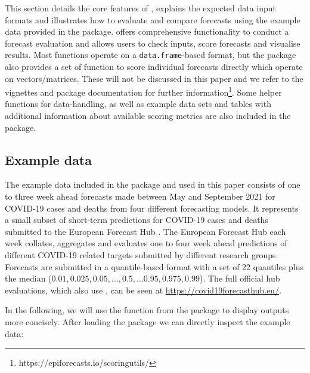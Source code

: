 \documentclass[
]{jss}
\begin{document}
This section details the core features of , explains
the expected data input formats and illustrates how to evaluate and
compare forecasts using the example data provided in the package.
 offers comprehensive functionality to conduct a
forecast evaluation and allows users to check inputs, score forecasts
and visualise results. Most functions operate on a
\texttt{data.frame}-based format, but the package also provides a set of
function to score individual forecasts directly which operate on
vectors/matrices. These will not be discussed in this paper and we refer
to the vignettes and package documentation for further
information\footnote{https://epiforecasts.io/scoringutils/}. Some helper
functions for data-handling, as well as example data sets and tables
with additional information about available scoring metrics are also
included in the package.

\hypertarget{example-data}{%
\subsection{Example data}\label{example-data}}

The example data included in the package and used in this paper consists
of one to three week ahead forecasts made between May and September 2021
for COVID-19 cases and deaths from four different forecasting models. It
represents a small subset of short-term predictions for COVID-19 cases
and deaths submitted to the European Forecast Hub
\citep{europeancovid-19forecasthubEuropeanCovid19Forecast2021}. The
European Forecast Hub each week collates, aggregates and evaluates one
to four week ahead predictions of different COVID-19 related targets
submitted by different research groups. Forecasts are submitted in a
quantile-based format with a set of 22 quantiles plus the median
(\(0.01, 0.025, 0.05, ..., 0.5, ... 0.95, 0.975, 0.99\)). The full
official hub evaluations, which also use , can be seen
at \url{https://covid19forecasthub.eu/}.

In the following, we will use the  function from the
package  to display outputs more concisely. After loading
the  package we can directly inspect the example data:
\end{document}
